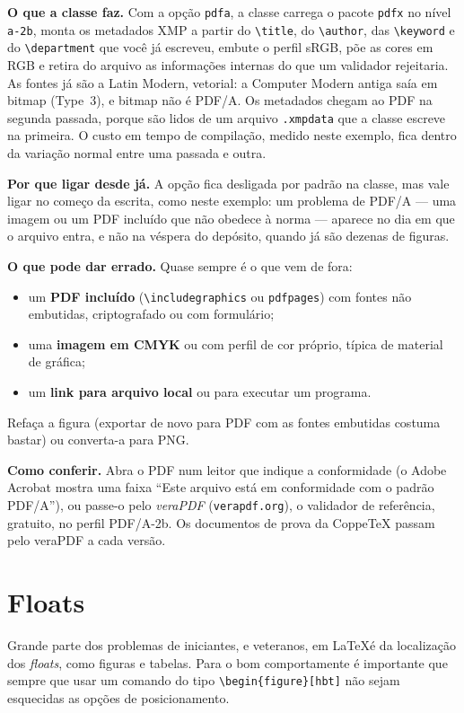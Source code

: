 \documentclass[dsc,pdfa,setavermelha]{ufrj}
\theoremstyle{plain}
\theoremstyle{definition}
\theoremstyle{remark}
\begin{document}
\textbf{O que a classe faz.} Com a opção \verb|pdfa|, a classe carrega o pacote \verb|pdfx| no nível \verb|a-2b|, monta os metadados XMP a partir do \verb|\title|, do \verb|\author|, das \verb|\keyword| e do \verb|\department| que você já escreveu, embute o perfil sRGB, põe as cores em RGB e retira do arquivo as informações internas do  que um validador rejeitaria. As fontes já são a Latin Modern, vetorial: a Computer Modern antiga saía em bitmap (Type~3), e bitmap não é PDF/A. Os metadados chegam ao PDF na segunda passada, porque são lidos de um arquivo \verb|.xmpdata| que a classe escreve na primeira. O custo em tempo de compilação, medido neste exemplo, fica dentro da variação normal entre uma passada e outra.

\textbf{Por que ligar desde já.} A opção fica desligada por padrão na classe, mas vale ligar no começo da escrita, como neste exemplo: um problema de PDF/A --- uma imagem ou um PDF incluído que não obedece à norma --- aparece no dia em que o arquivo entra, e não na véspera do depósito, quando já são dezenas de figuras.

\textbf{O que pode dar errado.} Quase sempre é o que vem de fora:
\begin{itemize}
  \item um \textbf{PDF incluído} (\verb|\includegraphics| ou \verb|pdfpages|) com fontes não embutidas, criptografado ou com formulário;
  \item uma \textbf{imagem em CMYK} ou com perfil de cor próprio, típica de material de gráfica;
  \item um \textbf{link para arquivo local} ou para executar um programa.
\end{itemize}
Refaça a figura (exportar de novo para PDF com as fontes embutidas costuma bastar) ou converta-a para PNG.

\textbf{Como conferir.} Abra o PDF num leitor que indique a conformidade (o Adobe Acrobat mostra uma faixa ``Este arquivo está em conformidade com o padrão PDF/A''), ou passe-o pelo \emph{veraPDF} (\texttt{verapdf.org}), o validador de referência, gratuito, no perfil PDF/A-2b. Os documentos de prova da CoppeTeX passam pelo veraPDF a cada versão.

\chapter{Floats}

Grande parte dos problemas de iniciantes, e veteranos, em \LaTeX é da localização dos \textit{floats}, como figuras e tabelas. Para o bom comportamente é importante que sempre que usar um comando do tipo \verb*|\begin{figure}[hbt]| não sejam esquecidas as opções de posicionamento.
\end{document}
